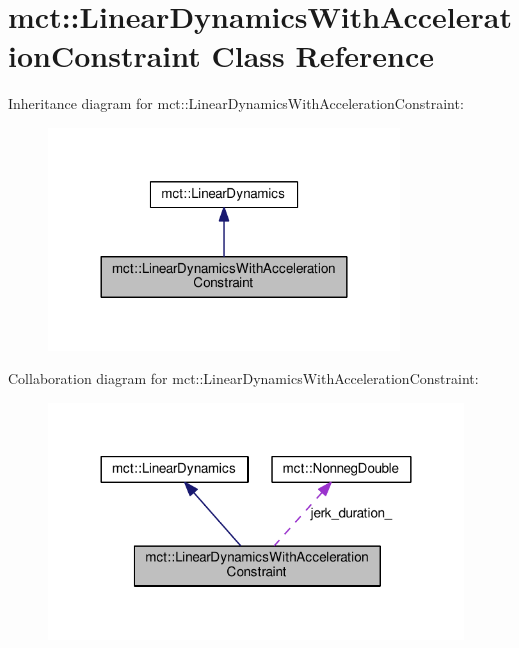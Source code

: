 \hypertarget{classmct_1_1LinearDynamicsWithAccelerationConstraint}{}\section{mct\+:\+:Linear\+Dynamics\+With\+Acceleration\+Constraint Class Reference}
\label{classmct_1_1LinearDynamicsWithAccelerationConstraint}


Inheritance diagram for mct\+:\+:Linear\+Dynamics\+With\+Acceleration\+Constraint\+:
\nopagebreak
\begin{figure}[H]
\begin{center}
\leavevmode
\includegraphics[width=264pt]{classmct_1_1LinearDynamicsWithAccelerationConstraint__inherit__graph}
\end{center}
\end{figure}


Collaboration diagram for mct\+:\+:Linear\+Dynamics\+With\+Acceleration\+Constraint\+:
\nopagebreak
\begin{figure}[H]
\begin{center}
\leavevmode
\includegraphics[width=312pt]{classmct_1_1LinearDynamicsWithAccelerationConstraint__coll__graph}
\end{center}
\end{figure}
